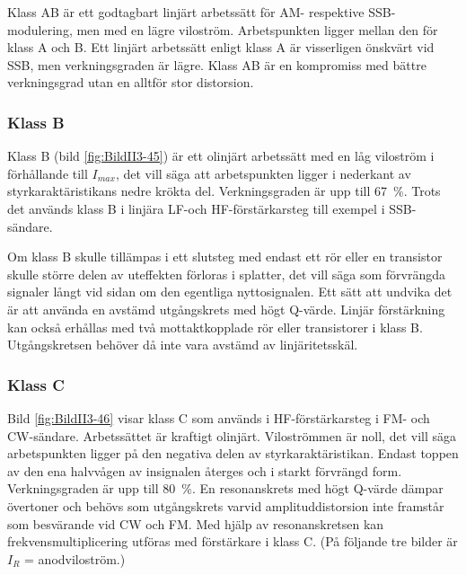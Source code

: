 Klass AB är ett godtagbart linjärt arbetssätt för AM- respektive SSB-modulering,
men med en lägre viloström.
Arbetspunkten ligger mellan den för klass A och B.
Ett linjärt arbetssätt enligt klass A är visserligen önskvärt vid SSB, men
verkningsgraden är lägre.
Klass AB är en kompromiss med bättre verkningsgrad utan en alltför stor
distorsion.


\subsubsection{Klass B}

Klass B (bild \ref{fig:BildII3-45}) är ett olinjärt arbetssätt med en låg viloström i förhållande
till \(I_{max}\), det vill säga att arbetspunkten ligger i nederkant av
styrkaraktäristikans nedre krökta del. Verkningsgraden är upp till
67~\%. Trots det används klass B i linjära LF-och HF-förstärkarsteg
till exempel i SSB-sändare.

Om klass B skulle tillämpas i ett slutsteg med endast ett rör eller en
transistor skulle större delen av uteffekten förloras i splatter,
det vill säga som förvrängda signaler långt vid sidan om den egentliga
nyttosignalen.
Ett sätt att undvika det är att använda en avstämd utgångskrets med högt
Q-värde.
Linjär förstärkning kan också erhållas med två mottaktkopplade rör eller
transistorer i klass B.
Utgångskretsen behöver då inte vara avstämd av linjäritetsskäl.


\subsubsection{Klass C}

Bild \ref{fig:BildII3-46} visar klass C som används i HF-förstärkar\-steg i
FM- och CW-sändare.
Arbetssättet är kraftigt olinjärt.
Viloströmmen är noll, det vill säga arbetspunkten ligger på den negativa delen
av styrkaraktäristikan.
Endast toppen av den ena halvvågen av insignalen återges och i starkt
förvrängd form.
Verkningsgraden är upp till 80~\%.
En resonanskrets med högt Q-värde dämpar övertoner och behövs som utgångskrets
varvid amplituddistorsion inte framstår som besvärande vid CW och FM.
Med hjälp av resonanskretsen kan frekvensmultiplicering utföras med
förstärkare i klass C.
(På följande tre bilder är \(I_R\) = anodviloström.)

